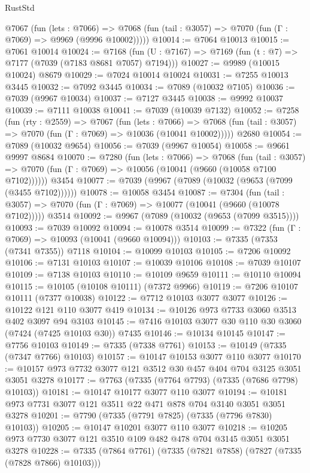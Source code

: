 \begin{lexlean}{RustStd}
\begin{coremodule}
    @7067
      (fun (lets : @7066) =>
      @7068 (fun (tail : @3057) => @7070 (fun (Γ : @7069) => @9969 (@9996 @10002)))))
@10014 := @7064 @10013
@10015 := @7061 @10014
@10024 := @7168 (fun (U : @7167) => @7169 (fun (t : @7) => @7177 (@7039 (@7183 @8681 @7057) @7194)))
@10027 := @9989 (@10015 @10024) @8679
@10029 := @7024 @10014 @10024
@10031 := @7255 @10013 @3445
@10032 := @7092 @3445
@10034 := @7089 (@10032 @7105)
@10036 := @7039 (@9967 @10034)
@10037 := @7127 @3445
@10038 := @9992 @10037
@10039 := @7111 @10038
@10041 := @7039 (@10039 @7132)
@10052 := @7258
    (fun (rty : @2559) =>
    @7067
      (fun (lets : @7066) =>
      @7068 (fun (tail : @3057) => @7070 (fun (Γ : @7069) => @10036 (@10041 @10002)))))
    @2680
@10054 := @7089 (@10032 @9654)
@10056 := @7039 (@9967 @10054)
@10058 := @9661 @9997 @8684
@10070 := @7280
    (fun (lets : @7066) =>
    @7068
      (fun (tail : @3057) =>
      @7070 (fun (Γ : @7069) => @10056 (@10041 (@9660 (@10058 @7100 @7102))))))
    @3454
@10077 := @7039 (@9967 (@7089 (@10032 (@9653 (@7099 (@3455 @7102))))))
@10078 := @10058 @3454
@10087 := @7304
    (fun (tail : @3057) => @7070 (fun (Γ : @7069) => @10077 (@10041 (@9660 (@10078 @7102)))))
    @3514
@10092 := @9967 (@7089 (@10032 (@9653 (@7099 @3515))))
@10093 := @7039 @10092
@10094 := @10078 @3514
@10099 := @7322 (fun (Γ : @7069) => @10093 (@10041 (@9660 @10094)))
@10103 := @7335 (@7353 (@7341 @7355)) @7118
@10104 := @10099 @10103
@10105 := @7206 @10092
@10106 := @7131 @10103
@10107 := @10039 @10106
@10108 := @7039 @10107
@10109 := @7138 @10103
@10110 := @10109 @9659
@10111 := @10110 @10094
@10115 := @10105 (@10108 @10111) (@7372 @9966)
@10119 := @7206 @10107 @10111 (@7377 @10038)
@10122 := @7712 @10103 @3077 @3077
@10126 := @10122 @121 @110 @3077 @419
@10134 := @10126 @973 @7733 @3060 @3513 @402 @3097 @94 @3103
@10145 := @7416 @10103 @3077 @30 @110 @30 @3060 (@7424 (@7425 @10103 @30)) @7435
@10146 := @10134 @10145
@10147 := @7756 @10103
@10149 := @7335 (@7338 @7761)
@10153 := @10149 (@7335 (@7347 @7766) @10103)
@10157 := @10147 @10153 @3077 @110 @3077
@10170 := @10157 @973 @7732 @3077 @121 @3512 @30 @457 @404 @704 @3125 @3051 @3051 @3278
@10177 := @7763 (@7335 (@7764 @7793) (@7335 (@7686 @7798) @10103))
@10181 := @10147 @10177 @3077 @110 @3077
@10194 := @10181 @973 @7731 @3077 @121 @3511 @22 @471 @878 @704 @3140 @3051 @3051 @3278
@10201 := @7790 (@7335 (@7791 @7825) (@7335 (@7796 @7830) @10103))
@10205 := @10147 @10201 @3077 @110 @3077
@10218 := @10205 @973 @7730 @3077 @121 @3510 @109 @482 @478 @704 @3145 @3051 @3051 @3278
@10228 := @7335 (@7864 @7761) (@7335 (@7821 @7858) (@7827 (@7335 (@7828 @7866) @10103)))

\end{coremodule}
\end{lexlean}
